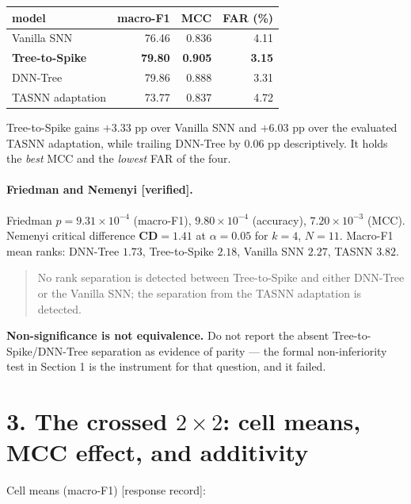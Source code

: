 \begin{center}\small
\begin{tabular}{lrrr}\toprule
model & macro-F1 & MCC & FAR (\%) \\\midrule
Vanilla SNN            & 76.46 & 0.836 & 4.11 \\
\textbf{Tree-to-Spike} & \textbf{79.80} & \textbf{0.905} & \textbf{3.15} \\
DNN-Tree               & 79.86 & 0.888 & 3.31 \\
TASNN adaptation       & 73.77 & 0.837 & 4.72 \\
\bottomrule\end{tabular}\end{center}

\noindent Tree-to-Spike gains $\mathbf{+3.33}$ pp over Vanilla SNN and $\mathbf{+6.03}$ pp
over the evaluated TASNN adaptation, while trailing DNN-Tree by $\mathbf{0.06}$ pp
descriptively. It holds the \emph{best} MCC and the \emph{lowest} FAR of the four.

\paragraph{Friedman and Nemenyi \textup{[verified]}.} Friedman
$p = 9.31\times10^{-4}$ (macro-F1), $9.80\times10^{-4}$ (accuracy),
$7.20\times10^{-3}$ (MCC). Nemenyi critical difference $\mathbf{CD = 1.41}$ at
$\alpha=0.05$ for $k=4$, $N=11$. Macro-F1 mean ranks: DNN-Tree $\mathbf{1.73}$,
Tree-to-Spike $\mathbf{2.18}$, Vanilla SNN $\mathbf{2.27}$, TASNN $\mathbf{3.82}$.

\begin{quote}
No rank separation is detected between Tree-to-Spike and either DNN-Tree or the Vanilla
SNN; the separation from the TASNN adaptation is detected.
\end{quote}

\noindent\textbf{Non-significance is not equivalence.} Do not report the absent
Tree-to-Spike/DNN-Tree separation as evidence of parity --- the formal
non-inferiority test in Section 1 is the instrument for that question, and it failed.

\section*{3. The crossed $2\times2$: cell means, MCC effect, and additivity}

Cell means (macro-F1) \textup{[response record]}:

